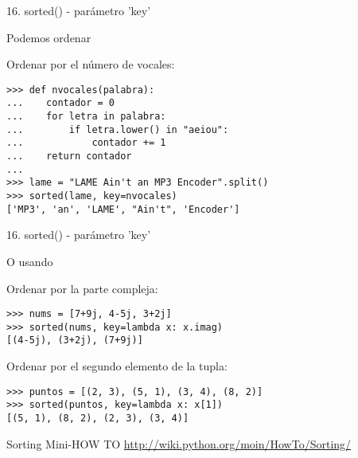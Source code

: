 \begin{frame}[fragile]{16. sorted() - parámetro 'key'}
  \begin{block}{}
    \centering
    Podemos ordenar 
  \end{block}

  \footnotesize
  \begin{exampleblock}
    {Ordenar por el número de vocales:}
    \begin{lstlisting}
>>> def nvocales(palabra):
...    contador = 0
...    for letra in palabra:
...        if letra.lower() in "aeiou":
...	           contador += 1
...    return contador
...
>>> lame = "LAME Ain't an MP3 Encoder".split()
>>> sorted(lame, key=nvocales)
['MP3', 'an', 'LAME', "Ain't", 'Encoder']
    \end{lstlisting}
  \end{exampleblock}
\end{frame}

\begin{frame}[fragile]{16. sorted() - parámetro 'key'}
  \begin{block}{}
    \centering
    O usando 
  \end{block}

  \footnotesize
  \begin{exampleblock}
    {Ordenar por la parte compleja:}
    \begin{lstlisting}
>>> nums = [7+9j, 4-5j, 3+2j]
>>> sorted(nums, key=lambda x: x.imag)
[(4-5j), (3+2j), (7+9j)]
    \end{lstlisting}
  \end{exampleblock}

  \begin{exampleblock}
    {Ordenar por el segundo elemento de la tupla:}
    \begin{lstlisting}
>>> puntos = [(2, 3), (5, 1), (3, 4), (8, 2)]
>>> sorted(puntos, key=lambda x: x[1])
[(5, 1), (8, 2), (2, 3), (3, 4)]
    \end{lstlisting}
  \end{exampleblock}

  \begin{block}
    {\centering Sorting Mini-HOW TO}
    \centering \url{http://wiki.python.org/moin/HowTo/Sorting/}
  \end{block}
\end{frame}
